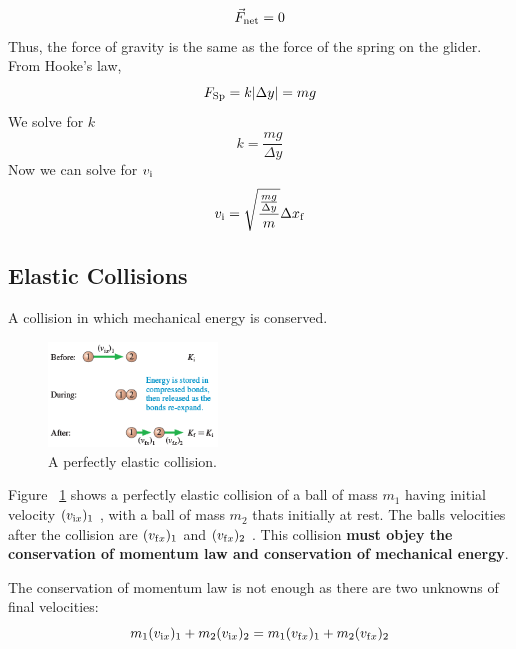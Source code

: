 \begin{Answer}
\begin{equation}
        \vec{F}_{\mathrm{net}} = 0
    \end{equation}
    Thus, the force of gravity is the same as the force of the spring on
    the glider.  From Hooke's law,
    \begin{equation}
        F_\mathrm{Sp} = k|\Delta y| = mg
    \end{equation}
    We solve for
    $
        k
    $
    \begin{equation}
        k=\frac{mg}{\Delta y}
    \end{equation}
    Now we can solve for
    $
        v_{\mathrm{i}}
    $
    \begin{equation}
        v_{\mathrm{i}} = \sqrt{\frac{\frac{mg}{\Delta y}}{m}} \Delta x_{\mathrm{f}}
    \end{equation}

\end{Answer}

\subsection{Elastic Collisions}

\begin{definition}
    A collision in which mechanical energy is conserved.
\end{definition}

\begin{figure}
    \centering
    \includegraphics[width=0.4\textwidth]{../figures/perfectly-elastic-collision.png}
    \caption{A perfectly elastic collision.}%
    \label{fig:perfectly-elastic-collision}
\end{figure}

Figure~%
\ref{fig:perfectly-elastic-collision} shows a perfectly elastic
collision of a ball of mass
$
    m_1
$ having initial velocity
$
    (v_{\mathrm{i} x})_1
$%
, with a ball of mass
$
    m_2
$ thats initially at rest.  The balls velocities after the collision are
$
    (v_{\mathrm{f} x})_1
$ and
$
    (v_{\mathrm{f} x})_2
$%
.  This collision \textbf{must objey the conservation of momentum law
and conservation of mechanical energy}.

The conservation of momentum law is not enough as there are two unknowns
of final velocities:
\begin{equation}
    m_1(v_{\mathrm{i} x})_1 + m_2(v_{\mathrm{i} x})_2 = m_1(v_{\mathrm{f} x})_1 + m_2(v_{\mathrm{f}
    x})_2
\end{equation}

